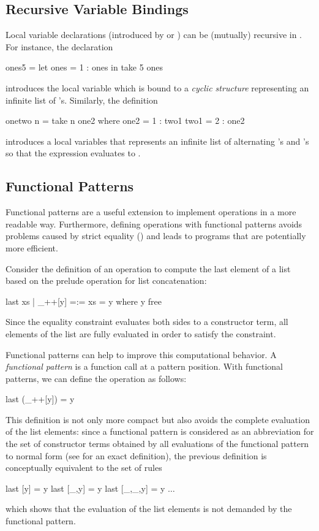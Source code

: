 \subsection{Recursive Variable Bindings}

Local variable declarations (introduced by 
or ) can be (mutually) recursive in \CYS.
For instance, the declaration
\begin{curry}
ones5 = let ones = 1 : ones
         in take 5 ones
\end{curry}
introduces the local variable  which is bound
to a \emph{cyclic structure}
representing an infinite list of 's.
Similarly, the definition
\begin{curry}
onetwo n = take n one2
 where
   one2 = 1 : two1
   two1 = 2 : one2
\end{curry}
introduces a local variables  that represents
an infinite list of alternating 's and 's
so that the expression  evaluates to \code{[1,2,1,2,1,2]}.


\subsection{Functional Patterns}

Functional patterns \cite{AntoyHanus05LOPSTR} are a useful extension
to implement operations in a more readable way. Furthermore,
defining operations with functional patterns avoids problems
caused by strict equality (\ccode{=:=}) and leads to programs
that are potentially more efficient.

Consider the definition of an operation to compute the last element
of a list  based on the prelude operation \ccode{++}
for list concatenation:
\begin{curry}
last xs | _++[y] =:= xs  = y   where y free
\end{curry}
Since the equality constraint \ccode{=:=} evaluates both sides
to a constructor term, all elements of the list  are
fully evaluated in order to satisfy the constraint.

Functional patterns can help to improve this computational behavior.
A \emph{functional pattern}
is a function call at a pattern position. With functional patterns,
we can define the operation  as follows:
\begin{curry}
last (_++[y]) = y
\end{curry}
This definition is not only more compact but also avoids the complete
evaluation of the list elements: since a functional pattern is considered
as an abbreviation for the set of constructor terms obtained by all
evaluations of the functional pattern to normal form (see
\cite{AntoyHanus05LOPSTR} for an exact definition), the previous
definition is conceptually equivalent to the set of rules
\begin{curry}
last [y] = y
last [_,y] = y
last [_,_,y] = y
$\ldots$
\end{curry}
which shows that the evaluation of the list elements is not demanded
by the functional pattern.

